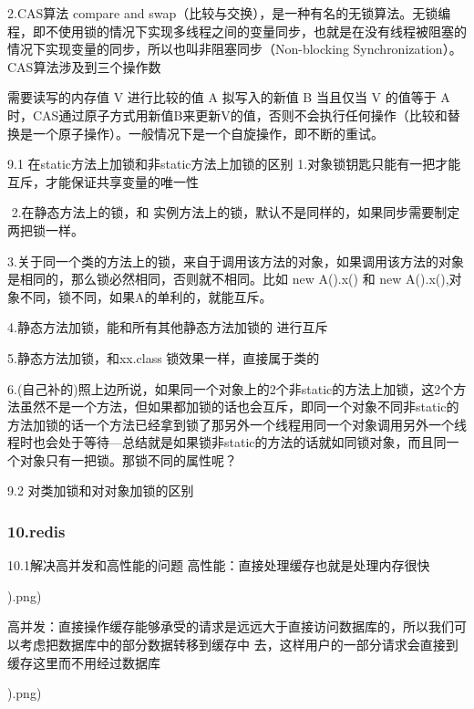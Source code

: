 \documentclass[UTF8]{ctexart}
\begin{document}
2.CAS算法
compare and swap（比较与交换），是一种有名的无锁算法。无锁编程，即不使用锁的情况下实现多线程之间的变量同步，也就是在没有线程被阻塞的情况下实现变量的同步，所以也叫非阻塞同步（Non-blocking Synchronization）。CAS算法涉及到三个操作数

需要读写的内存值 V
进行比较的值 A
拟写入的新值 B
当且仅当 V 的值等于 A时，CAS通过原子方式用新值B来更新V的值，否则不会执行任何操作（比较和替换是一个原子操作）。一般情况下是一个自旋操作，即不断的重试。

9.1 在static方法上加锁和非static方法上加锁的区别
1.对象锁钥匙只能有一把才能互斥，才能保证共享变量的唯一性

​ 2.在静态方法上的锁，和 实例方法上的锁，默认不是同样的，如果同步需要制定两把锁一样。

​ 3.关于同一个类的方法上的锁，来自于调用该方法的对象，如果调用该方法的对象是相同的，那么锁必然相同，否则就不相同。比如 new A().x() 和 new A().x(),对象不同，锁不同，如果A的单利的，就能互斥。

​4.静态方法加锁，能和所有其他静态方法加锁的 进行互斥

​5.静态方法加锁，和xx.class 锁效果一样，直接属于类的

6.(自己补的)照上边所说，如果同一个对象上的2个非static的方法上加锁，这2个方法虽然不是一个方法，但如果都加锁的话也会互斥，即同一个对象不同非static的方法加锁的话一个方法已经拿到锁了那另外一个线程用同一个对象调用另外一个线程时也会处于等待---总结就是如果锁非static的方法的话就如同锁对象，而且同一个对象只有一把锁。那锁不同的属性呢？

9.2 对类加锁和对对象加锁的区别
\subsubsection{10.redis}
10.1解决高并发和高性能的问题
高性能：直接处理缓存也就是处理内存很快

).png)

高并发：直接操作缓存能够承受的请求是远远大于直接访问数据库的，所以我们可以考虑把数据库中的部分数据转移到缓存中 去，这样用户的一部分请求会直接到缓存这里而不用经过数据库

).png)
\end{document}
